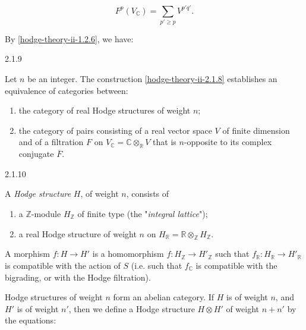     \[       F^p(V_\mathbb {C})       = \sum _{p'\geqslant  p} V^{p'q'}.     \]\par{}By \cref{hodge-theory-ii-1.2.6}, we have:\begin{proposition}{2.1.9}\label{hodge-theory-ii-2.1.9}\skipsinglepar\par{}Let \(n\) be an integer.
    The construction \cref{hodge-theory-ii-2.1.8} establishes an equivalence of categories between:

    
 \begin{enumerate}
      
 \item[(a)]
        the category of real Hodge structures of weight \(n\);
      

      
 \item[(b)]
        the category of pairs consisting of a real vector space \(V\) of finite dimension and of a filtration \(F\) on \(V_\mathbb {C}=\mathbb {C}\otimes _\mathbb {R} V\) that is \(n\)-opposite to its complex conjugate \(\overline {F}\).
      

    \end{enumerate}\end{proposition}\begin{definition}{2.1.10}\label{hodge-theory-ii-2.1.10}\skipsinglepar\par{}A \emph{Hodge structure} \(H\), of weight \(n\), consists of

    
 \begin{enumerate}
      
 \item[(a)]
        a \(\mathbb {Z}\)-module \(H_\mathbb {Z}\) of finite type (the "\emph{integral lattice}");
      

      
 \item[(b)]
        a real Hodge structure of weight \(n\) on \(H_\mathbb {R}=\mathbb {R}\otimes _\mathbb {Z} H_\mathbb {Z}\).
      

    \end{enumerate}\end{definition}\label{hodge-theory-ii-2.1.11}\par{}A morphism \(f\colon  H\to  H'\) is a homomorphism \(f\colon  H_\mathbb {Z}\to  H'_\mathbb {Z}\) such that \(f_\mathbb {R}\colon  H_\mathbb {R}\to  H'_\mathbb {R}\) is compatible with the action of \(S\) (i.e. such that \(f_\mathbb {C}\) is compatible with the bigrading, or with the Hodge filtration).\par{}Hodge structures of weight \(n\) form an abelian category.
    If \(H\) is of weight \(n\), and \(H'\) is of weight \(n'\), then we define a Hodge structure \(H\otimes  H'\) of weight \(n+n'\) by the equations:


